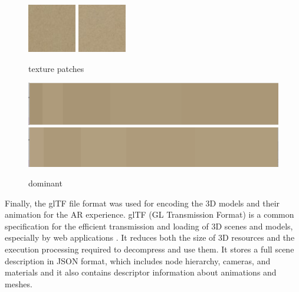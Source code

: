 \documentclass[acmlarge,screen,dvipsnames]{acmart}
\begin{document}
\begin{figure}[ht] \centering
\includegraphics[width=0.45\linewidth]{images/m1tex_80x80.png}
\includegraphics[width=0.45\linewidth]{images/m2tex_80x80.png}
\caption{texture patches} \label{fig:drawingmaps} 
\end{figure}


\begin{figure}[ht] \centering
\includegraphics[width=0.45\linewidth]{images/domtex1.png}
\includegraphics[width=0.45\linewidth]{images/domtex2.png}
\caption{dominant} \label{fig:drawingmaps} 
\end{figure}

Finally, the glTF file format was used for encoding the 3D models and their animation
for the AR experience. glTF (GL Transmission Format) is a common specification
for the efficient transmission and loading of 3D scenes and models, especially
by web applications \cite{khronos}. It reduces both the size of 3D resources
and the execution processing required to decompress and use them. It stores a
full scene description in JSON format, which includes node hierarchy, cameras,
and materials and it also contains descriptor information about animations and
meshes.
\end{document}
